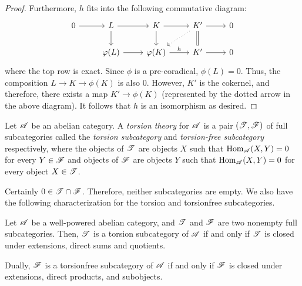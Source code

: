 \begin{proof}
Furthermore, $h$ fits into the following commutative diagram:
\[
\begin{tikzcd}
0 \arrow{r} &
L \arrow{r} \arrow{d} &
K \arrow{r} \arrow{d} &
K' \arrow{r} \arrow[equals]{d} \arrow[dotted]{ld} &
0 \\
& \phi(L) \arrow{r} &
\phi(K) \arrow{r}{h} &
K' \arrow{r} &
0
\end{tikzcd}
\]
where the top row is exact. Since $\phi$ is a pre-coradical, 
$\phi(L) = 0$. Thus, the composition $L \to K \to \phi(K)$ is also
$0$. However, $K'$ is the cokernel, and therefore, there exists a
map $K' \to \phi(K)$ (represented by the dotted arrow in the above 
diagram). It follows that $h$ is an isomorphism as desired.
\end{proof}

\begin{defn}
Let $\mathscr{A}$ be an abelian category. A \emph{torsion theory} for
$\mathscr{A}$ is a pair $(\mathscr{T}, \mathscr{F})$ of full subcategories 
called the \emph{torsion subcategory} and \emph{torsion-free 
subcategory} respectively, where the objects of $\mathscr{T}$ are
objects $X$ such that $\mathrm{Hom}_{\mathscr{A}}(X, Y) = 0$ for every $Y
\in \mathscr{F}$ and objects of $\mathscr{F}$ are objects $Y$ such that
$\mathrm{Hom}_{\mathscr{A}}(X, Y) = 0$ for every object $X \in \mathscr{T}$.
\end{defn}

Certainly $0 \in \mathscr{T} \cap \mathscr{F}$. Therefore, neither 
subcategories are empty. We also have the following characterization
for the torsion and torsionfree subcategories.

\begin{prop}\label{prop_tt_properties}
Let $\mathscr{A}$ be a well-powered abelian category, and $\mathscr{T}$ 
and $\mathscr{F}$ are two nonempty full subcategories. Then, $\mathscr{T}$ 
is a torsion subcategory of $\mathscr{A}$ if and only if $\mathscr{T}$ is 
closed under extensions, direct sums and quotients. 

Dually, $\mathscr{F}$ is a torsionfree subcategory of $\mathscr{A}$ if and 
only if $\mathscr{F}$ is closed under extensions, direct products, and 
subobjects.
\end{prop}


